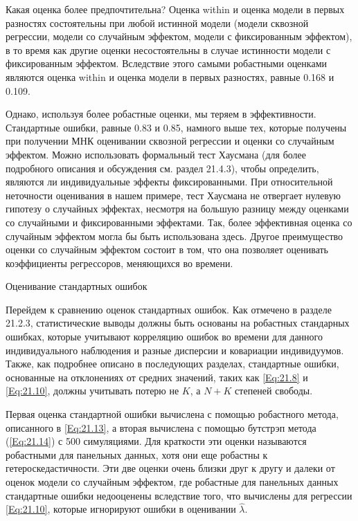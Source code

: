 Какая оценка более предпочтительна? Оценка within и оценка модели в первых разностях состоятельны при любой истинной модели (модели сквозной регрессии, модели со случайным эффектом, модели с фиксированным эффектом), в то время как другие оценки несостоятельны в случае истинности модели с фиксированным эффектом. Вследствие этого  самыми робастными оценками являются оценка within и оценка модели в первых разностях, равные 0.168 и 0.109.

Однако, используя более робастные оценки, мы теряем в эффективности. Стандартные ошибки, равные 0.83 и 0.85, намного выше тех, которые получены при получении МНК оценивании сквозной регрессии и оценки со случайным эффектом. Можно использовать формальный тест Хаусмана (для более подробного описания и обсуждения см. раздел 21.4.3), чтобы определить, являются ли индивидуальные эффекты фиксированными. При относительной неточности оценивания в нашем примере, тест Хаусмана не отвергает нулевую гипотезу о случайных эффектах, несмотря на большую разницу между оценками со случайными и фиксированными эффектами. Так, более эффективная оценка со случайным эффектом могла бы быть использована здесь. Другое преимущество оценки со случайным эффектом состоит в том, что она позволяет оценивать коэффициенты регрессоров, меняющихся во времени.

{\centering
Оценивание стандартных ошибок\\}

Перейдем к сравнению оценок стандартных ошибок. Как отмечено в разделе 21.2.3, статистические выводы должны быть основаны на робастных стандарных ошибках, которые учитывают корреляцию ошибок во времени для данного индивидуального наблюдения и разные дисперсии и ковариации индивидуумов. Также, как подробнее описано в последующих разделах, стандартные ошибки, основанные на отклонениях от средних значений, таких как \ref{Eq:21.8} и \ref{Eq:21.10},  должны учитывать потерю не $K$, а $N+K$ степеней свободы.

Первая оценка стандартной ошибки вычислена с помощью робастного метода, описанного в  \ref{Eq:21.13}, а вторая вычислена с помощью бутстрэп метода (\ref{Eq:21.14}) с 500 симуляциями. Для краткости эти оценки называются робастными для панельных данных, хотя они еще робастны к гетероскедастичности. Эти две оценки очень близки друг к другу и далеки от оценок модели со случайным эффектом, где робастные для панельных данных стандартные ошибки недооценены вследствие того, что вычислены для регрессии \ref{Eq:21.10}, которые игнорируют ошибки в оценивании $\hat{\lambda}$.


